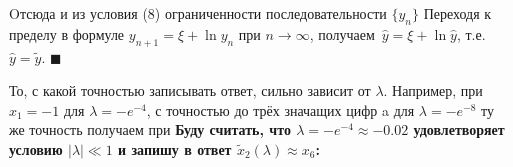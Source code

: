 Oтсюда и из условия (8) ограниченности последовательности $\{y_n\}$
Переходя к пределу в формуле $y_{n+1} = \xi + \ln{y_n}$ при $n \to \infty$, получаем\
$\hat{y} = \xi + \ln{\hat{y}}$, т.е. $\hat{y} = \tilde{y}$. $\blacksquare$

То, с какой точностью записывать ответ, сильно зависит от $\lambda$. Например, при\
$x_1 = -1$ для $\lambda = -e^{-4}$, с точностью до трёх значащих цифр
a для $\lambda = -e^{-8}$ ту же точность получаем при
\salign[*]{\tilde{x}_2(-e^{-8}) \approx x_4 = -(\xi + \ln{(\xi + \ln{\xi})}), \ \xi = -\ln{(-\lambda)} = 8.}
\textbf{Буду считать, что $\lambda = -e^{-4} \approx -0.02$ удовлетворяет условию $|\lambda| \ll 1$ и запишу в ответ $\tilde{x}_2(\lambda) \approx x_6$:}
